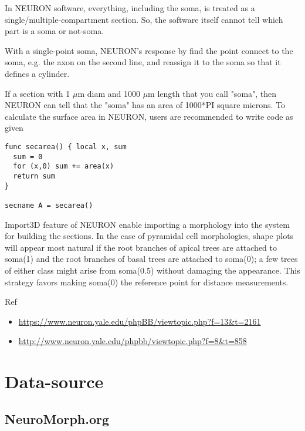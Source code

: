 \begin{mdframed}

In NEURON software, everything, including the soma, is treated as a
single/multiple-compartment section. So, the software itself cannot tell which
part is a soma or not-soma. 

With a single-point soma, NEURON's response by find the point connect
to the soma, e.g. the axon on the second line, and reassign it to the soma
so that it defines a cylinder.

If a section with 1 $\mu$m diam and 1000 $\mu$m length that you call "soma",
then NEURON can tell that the "soma" has an area of 1000*PI
square microns. To calculate the surface area in NEURON, users are
recommended to write code as given
\begin{verbatim}
func secarea() { local x, sum
  sum = 0
  for (x,0) sum += area(x)
  return sum
}

secname A = secarea()
\end{verbatim}

Import3D feature of NEURON enable importing a morphology into the system for
building the sections. In the case of pyramidal cell morphologies, shape plots
will appear most natural if the root branches of apical trees are attached to soma(1) and the root
branches of basal trees are attached to soma(0); a few trees of either class
might arise from soma(0.5) without damaging the appearance. This strategy favors
making soma(0) the reference point for distance measurements.

\end{mdframed}

Ref
\begin{itemize}
  \item \url{https://www.neuron.yale.edu/phpBB/viewtopic.php?f=13&t=2161}
  
  \item \url{http://www.neuron.yale.edu/phpbb/viewtopic.php?f=8&t=858}
  
\end{itemize}

\section{Data-source}

\subsection{NeuroMorph.org}
\label{sec:NeuroMorpho.org}

